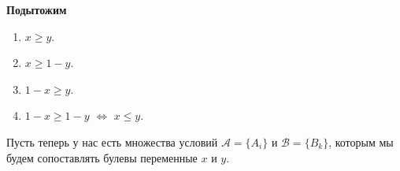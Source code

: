 \textbf{Подытожим}
\begin{enumerate}
	\item {} \qquad\qquad $x \ge y$.
	
	\item {} \qquad\qquad $x \ge 1 - y$.
	
	\item {} \qquad\qquad $1- x \ge y$.
	
	\item {} \qquad\qquad $1 - x \ge 1 - y$ \quad $\Longleftrightarrow$ \quad $x \le y$.
\end{enumerate}

\label{fact:complex_conditions}

Пусть теперь у нас есть множества условий $\mathcal{A} = \{A_i\}$ и $\mathcal{B} = \{B_k\}$, которым мы будем сопоставлять булевы переменные $x$ и $y$.

